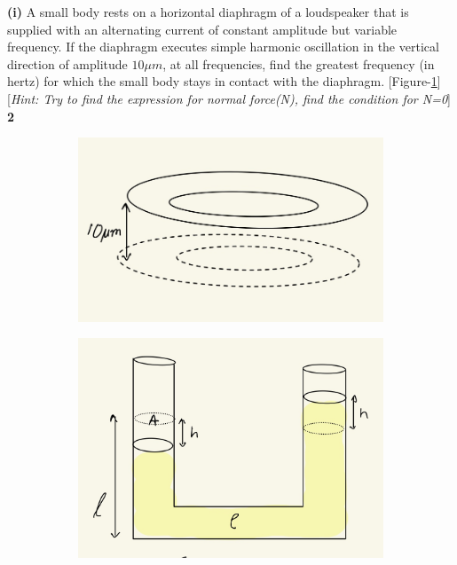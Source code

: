 \documentclass[12pt, a4paper]{article}
\begin{document}
{\textbf{(i)} A small body rests on a horizontal diaphragm of 
a loudspeaker that is supplied with an alternating current of
constant amplitude but variable frequency. If the diaphragm executes
simple harmonic oscillation in the vertical direction of amplitude $10\mu m$,
at all frequencies, find the greatest frequency (in hertz) for which 
the small body stays in contact with the diaphragm. [Figure-\ref{fig:speaker}][\textit{Hint: 
Try to find the expression for normal force(N), find the condition for N=0}]
\hfill \textbf{2}\\
\begin{figure}[h]
    \begin{subfigure}{.35\textwidth}
        \centering
        \includegraphics*[scale=0.2]{figs/speaker.jpeg}
        \caption{}
        \label{fig:speaker}
    \end{subfigure}
    \begin{subfigure}{.2\textwidth}
        \centering
        \includegraphics*[scale=0.14]{figs/Utube.jpeg}

\end{subfigure}
\end{figure}}
\end{document}
